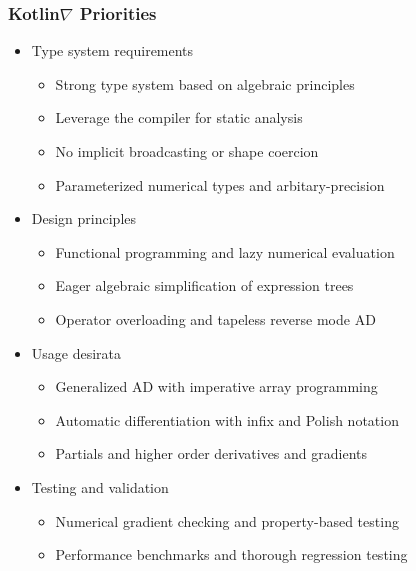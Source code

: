 \documentclass{beamer}
\begin{document}
    \begin{frame}
        \frametitle{Kotlin\texorpdfstring{$\nabla$}{} Priorities}
        \begin{itemize}
            \item Type system requirements
            \begin{itemize}
                \item Strong type system based on algebraic principles
                \item Leverage the compiler for static analysis
                \item No implicit broadcasting or shape coercion
                \item Parameterized numerical types and arbitary-precision
            \end{itemize}
            \item Design principles
            \begin{itemize}
                \item Functional programming and lazy numerical evaluation
                \item Eager algebraic simplification of expression trees
                \item Operator overloading and tapeless reverse mode AD
            \end{itemize}
            \item Usage desirata
            \begin{itemize}
                \item Generalized AD with imperative array programming
                \item Automatic differentiation with infix and Polish notation
                \item Partials and higher order derivatives and gradients
            \end{itemize}
            \item Testing and validation
            \begin{itemize}
                \item Numerical gradient checking and property-based testing
                \item Performance benchmarks and thorough regression testing
            \end{itemize}
        \end{itemize}
    \end{frame}
\end{document}
